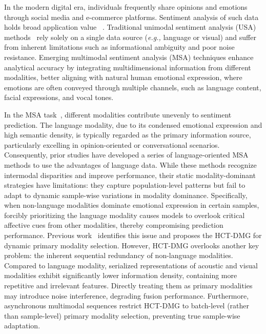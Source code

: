 \documentclass[letterpaper]{article} %
\begin{document}
In the modern digital era, individuals frequently share opinions and emotions through social media and e-commerce platforms. Sentiment analysis of such data holds broad application value ~\cite{gallagher2019application, tsai2021analyzing, drus2019sentiment,yang2022emotion,yang2023context}. Traditional unimodal sentiment analysis (USA) methods~\cite{ortis2019overview, xiao2021research} rely solely on a single data source (\textit{e.g.,} language or visual) and suffer from inherent limitations such as informational ambiguity and poor noise resistance. Emerging multimodal sentiment analysis (MSA) techniques enhance analytical accuracy by integrating multidimensional information from different modalities, better aligning with natural human emotional expression, where emotions are often conveyed through multiple channels, such as language content, facial expressions, and vocal tones.


In the MSA task~\cite{mai2022hybrid}, different modalities contribute unevenly to sentiment prediction. The language modality, due to its condensed emotional expression and high semantic density, is typically regarded as the primary information source, particularly excelling in opinion-oriented or conversational scenarios. Consequently, prior studies have developed a series of language-oriented MSA methods \cite{wu2021text,lei2023text,zhang2023learning} to use the advantages of language data. While these methods recognize intermodal disparities and improve performance, their static modality-dominant strategies have limitations: they capture population-level patterns but fail to adapt to dynamic sample-wise variations in modality dominance. 
Specifically, when non-language modalities dominate emotional expression in certain samples, forcibly prioritizing the language modality causes models to overlook critical affective cues from other modalities, thereby compromising prediction performance. 
Previous work~\cite{wang2023cross} identifies this issue and proposes the HCT-DMG for dynamic primary modality selection. However, HCT-DMG overlooks another key problem: the inherent sequential redundancy of non-language modalities. Compared to language modality, serialized representations of acoustic and visual modalities exhibit significantly lower information density, containing more repetitive and irrelevant features. Directly treating them as primary modalities may introduce noise interference, degrading fusion performance. Furthermore, asynchronous multimodal sequences restrict HCT-DMG to batch-level (rather than sample-level) primary modality selection, preventing true sample-wise adaptation.
\end{document}
